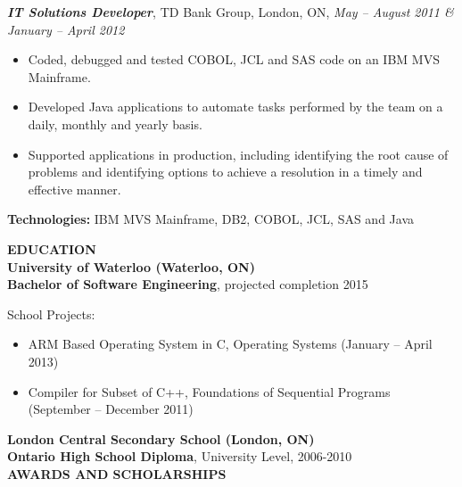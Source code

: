 \documentclass[10pt,letterpaper]{article}
\newenvironment{indentedlist}[1]%
{
\begin{list}{}%
    {\setlength{\leftmargin}{#1}}%
    \item[]%
}
{\end{list}
}
\newcommand{\job}[4]
{
    \emph{\textbf{#1}}, #2, #3, \emph{#4}
}
\newcommand{\education}[4]
{
    \textbf{#1 (#2)}\\
    \textbf{#3}, #4
}
\begin{document}
\vspace{0.5em}
\newpage
\noindent \job{IT Solutions Developer}{TD Bank Group}{London, ON}{May -- August 2011 \& January -- April 2012}\\
\begin{adjustwidth}{0.1in}{0.5in}
    \begin{itemize}
	\item Coded, debugged and tested COBOL, JCL and SAS code on an IBM MVS Mainframe.
	\item Developed Java applications to automate tasks performed by the team on a daily, monthly and yearly basis.
	\item Supported applications in production, including identifying the root cause of problems and identifying 
	    options to achieve a resolution in a timely and effective manner.
    \end{itemize}
    \vspace{0.5em}
    \textbf{Technologies:} IBM MVS Mainframe, DB2, COBOL, JCL, SAS and Java
\end{adjustwidth}
\vspace{1em}
\textbf{EDUCATION} \hrulefill \\[0.5em]
\education{University of Waterloo}{Waterloo, ON}{Bachelor of Software Engineering}{projected completion 2015}
\begin{indentedlist}{2em}
		\textbf{School Projects:}
		\begin{itemize}
			\item ARM Based Operating System in C, Operating Systems (January -- April 2013)
			\item Compiler for Subset of C++, Foundations of Sequential Programs (September -- December 2011)
		\end{itemize} 
\end{indentedlist}
\education{London Central Secondary School}{London, ON}{Ontario High School Diploma}{University Level, 2006-2010}\\[1em]
\textbf{AWARDS AND SCHOLARSHIPS} \hrulefill \\
\end{document}
